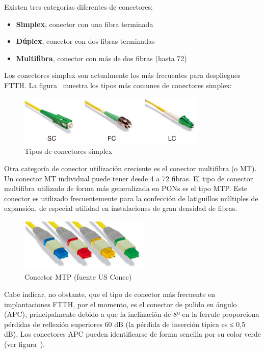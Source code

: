 Existen tres categorías diferentes de conectores:


\begin{itemize}
\item \textbf{Simplex}, conector con una fibra terminada
\item \textbf{Dúplex}, conector con dos fibras terminadas
\item \textbf{Multifibra}, conector con más de dos fibras (hasta 72)
\end{itemize}


Los conectores simplex son actualmente los más frecuentes para despliegues FTTH. La figura~ muestra los tipos más comunes de conectores simplex:


\begin{figure}[H]
	\centering
	\includegraphics[width=0.80\textwidth]{./img/punto6/Tipos-de-conectores-simplex.jpg}
	\caption{Tipos de conectores simplex}
	\label{fig:Simplex_connectors}
\end{figure}


Otra categoría de conector utilización creciente es el conector multifibra (o MT). Un conector MT individual puede tener desde 4 a 72 fibras. El tipo de conector multifibra utilizado de forma más generalizada en PONs es el tipo MTP. Este conector es utilizado frecuentemente para la confección de latiguillos múltiples de expansión, de especial utilidad en instalaciones de gran densidad de fibras.


\begin{figure}
  \begin{center}
   	\includegraphics[width=0.55\textwidth]{./img/punto6/Conector-MTP.jpg}	
   	\caption{Conector MTP (fuente US Conec)}
	\label{fig:MTP_connector}
  \end{center}  
\end{figure}

Cabe indicar, no obstante, que el tipo de conector más frecuente en implantaciones FTTH, por el momento, es el conector de pulido en ángulo (APC), principalmente debido a que la inclinación de 8º en la ferrule proporciona pérdidas de reflexión superiores 60 dB (la pérdida de inserción típica es ≤ 0,5 dB). Los conectores APC pueden identificarse de forma sencilla por su color verde (ver figura~).









